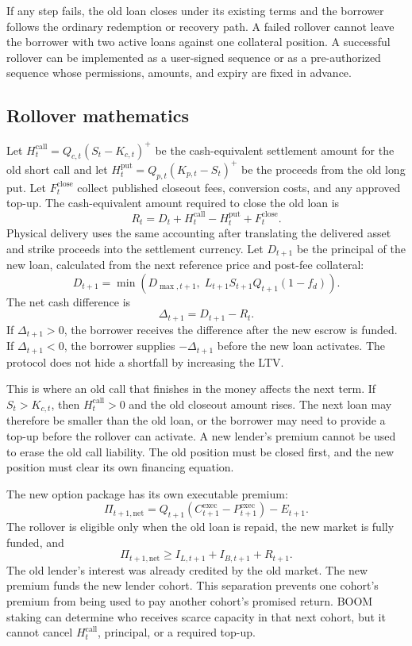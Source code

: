 \documentclass[11pt,oneside]{article}
\begin{document}
If any step fails, the old loan closes under its existing terms and the borrower
follows the ordinary redemption or recovery path. A failed rollover cannot
leave the borrower with two active loans against one collateral position. A
successful rollover can be implemented as a user-signed sequence or as a
pre-authorized sequence whose permissions, amounts, and expiry are fixed in
advance.

\subsection{Rollover mathematics}

Let $H_t^{\mathrm{call}}=Q_{c,t}(S_t-K_{c,t})^+$ be the cash-equivalent
settlement amount for the old short call and let
$H_t^{\mathrm{put}}=Q_{p,t}(K_{p,t}-S_t)^+$ be the proceeds from the old long
put. Let $F_t^{\mathrm{close}}$ collect published closeout fees, conversion
costs, and any approved top-up. The cash-equivalent amount required to close
the old loan is
\[
R_t=D_t+H_t^{\mathrm{call}}-H_t^{\mathrm{put}}+F_t^{\mathrm{close}}.
\]
Physical delivery uses the same accounting after translating the delivered
asset and strike proceeds into the settlement currency. Let $D_{t+1}$ be the
principal of the new loan, calculated from the next reference price and
post-fee collateral:
\[
D_{t+1}=\min\left(D_{\max,t+1},\;L_{t+1}S_{t+1}Q_{t+1}(1-f_d)\right).
\]
The net cash difference is
\[
\Delta_{t+1}=D_{t+1}-R_t.
\]
If $\Delta_{t+1}>0$, the borrower receives the difference after the new escrow
is funded. If $\Delta_{t+1}<0$, the borrower supplies $-\Delta_{t+1}$ before
the new loan activates. The protocol does not hide a shortfall by increasing
the LTV.

This is where an old call that finishes in the money affects the next term. If
$S_t>K_{c,t}$, then $H_t^{\mathrm{call}}>0$ and the old closeout amount rises.
The next loan may therefore be smaller than the old loan, or the borrower may
need to provide a top-up before the rollover can activate. A new lender's
premium cannot be used to erase the old call liability. The old position must
be closed first, and the new position must clear its own financing equation.

The new option package has its own executable premium:
\[
\Pi_{t+1,\mathrm{net}}
=Q_{t+1}\left(C_{t+1}^{\mathrm{exec}}-P_{t+1}^{\mathrm{exec}}\right)-E_{t+1}.
\]
The rollover is eligible only when the old loan is repaid, the new market is
fully funded, and
\[
\Pi_{t+1,\mathrm{net}}\geq I_{L,t+1}+I_{B,t+1}+R_{t+1}.
\]
The old lender's interest was already credited by the old market. The new
premium funds the new lender cohort. This separation prevents one cohort's
premium from being used to pay another cohort's promised return. BOOM staking
can determine who receives scarce capacity in that next cohort, but it cannot
cancel $H_t^{\mathrm{call}}$, principal, or a required top-up.
\end{document}
